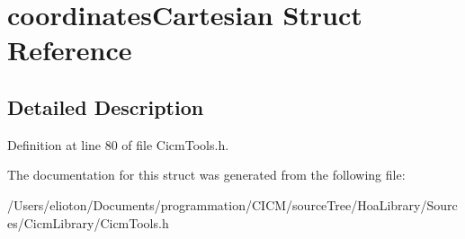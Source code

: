 \hypertarget{structcoordinates_cartesian}{\section{coordinates\-Cartesian Struct Reference}
\label{structcoordinates_cartesian}
}


\subsection{Detailed Description}


Definition at line 80 of file Cicm\-Tools.\-h.



The documentation for this struct was generated from the following file\-:\begin{DoxyCompactItemize}
\item 
/\-Users/elioton/\-Documents/programmation/\-C\-I\-C\-M/source\-Tree/\-Hoa\-Library/\-Sources/\-Cicm\-Library/Cicm\-Tools.\-h\end{DoxyCompactItemize}
